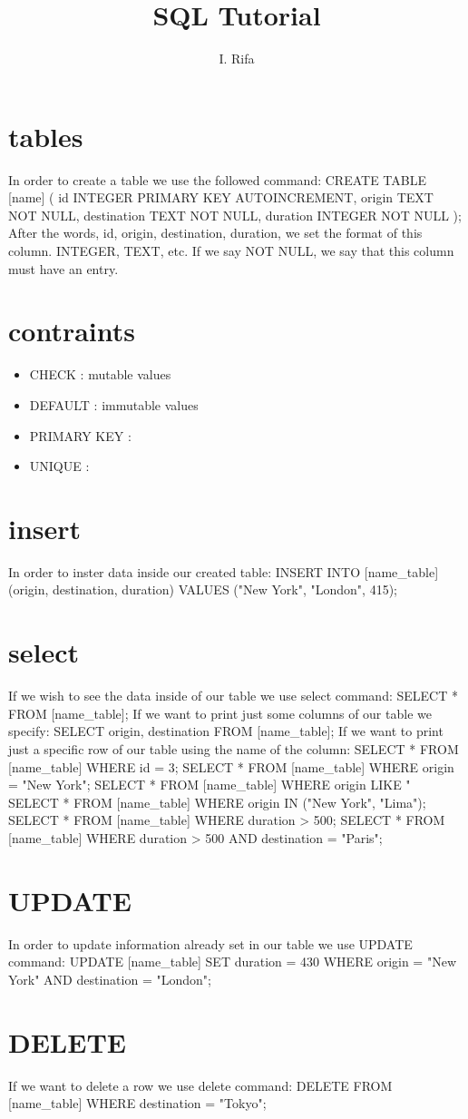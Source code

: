 \documentclass[12pt]{article}
\title{SQL Tutorial}
\author{I. Rifa}
\begin{document}
\maketitle

\section{tables}
In order to create a table we use the followed command:
CREATE TABLE [name] (
id INTEGER PRIMARY KEY AUTOINCREMENT,
origin TEXT NOT NULL,
destination TEXT NOT NULL,
duration INTEGER NOT NULL
);
After the words, id, origin, destination, duration, we set the format of this
column. INTEGER, TEXT, etc. If we say NOT NULL, we say that this column must
have an entry.

\section{contraints}
\begin{itemize}
    \item CHECK : mutable values
    \item DEFAULT : immutable values
    \item PRIMARY KEY :
    \item UNIQUE :
\end{itemize}

\section{insert}
In order to inster data inside our created table:
INSERT INTO [name_table]
(origin, destination, duration)
VALUES ("New York", "London", 415);
\section{select}
If we wish to see the data inside of our table we use select command:
SELECT * FROM [name_table];
If we want to print just some columns of our table we specify:
SELECT origin, destination FROM [name_table];
If we want to print just a specific row of our table using the name of the
column:
SELECT * FROM [name_table] WHERE id = 3;
SELECT * FROM [name_table] WHERE origin = "New York";
SELECT * FROM [name_table] WHERE origin LIKE "%
SELECT * FROM [name_table] WHERE origin IN ("New York", "Lima");
SELECT * FROM [name_table] WHERE duration > 500;
SELECT * FROM [name_table] WHERE duration > 500 AND destination = "Paris";

\section{UPDATE}
In order to update information already set in our table we use UPDATE command:
UPDATE [name_table]
	SET duration = 430
	WHERE origin = "New York"
	AND destination = "London";

\section{DELETE}
If we want to delete a row we use delete command:
DELETE FROM	[name_table] WHERE destination = "Tokyo";
\end{document}
